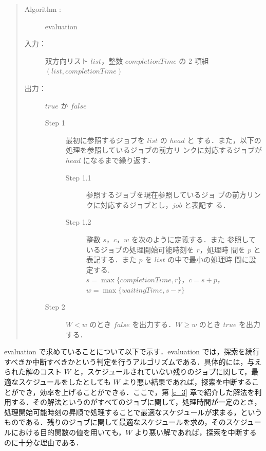\documentclass[12pt]{optlab-bachelor}
\begin{document}

\begin{quote}
  \begin{description}
    \item[{\sc Algorithm : }] {\sc evaluation}
    \item[入力：] 双方向リスト $list$，整数 $completionTime$ の
    2 項組\\ $(list,completionTime)$
    \item[出力：] $true$ か $false$
    \begin{description}
      \item[Step 1 ] 最初に参照するジョブを $list$ の $head$ と
      する．また，以下の処理を参照しているジョブの前方リ
      ンクに対応するジョブが $head$ になるまで繰り返す．
      \begin{description}
        \item[Step 1.1] 参照するジョブを現在参照しているジョ
        ブの前方リンクに対応するジョブとし，$job$ と表記す
        る．
        \item[Step 1.2 ] 整数 $s$，$c$，$w$ を次のように定義する．また
        参照しているジョブの処理開始可能時刻を $r$，処理時
        間を $p$ と表記する．また $p$ を $list$ の中で最小の処理時
        間に設定する.\\
        $s = \max\{completionTime, r\}$，$c = s + p$，\\$w =
        \max\{waitingTime,s - r\}$
      \end{description}
      \item[Step 2 ] $W < w$ のとき $false$ を出力する．$W \ge w$
      のとき $true$ を出力する．
    \end{description}
  \end{description}
\end{quote}

{\sc evaluation} で求めていることについて以下で示す．{\sc evaluation} では，探索を続行すべきか中断すべきかという判定を行うアルゴリズムである．具体的には，与えられた解のコスト $W$ と，スケジュールされていない残りのジョブに関して，最適なスケジュールをしたとしても $W$ より悪い結果であれば，探索を中断することができ，効率を上げることができる．ここで，第 \ref{c_3} 章で紹介した解法を利用する．その解法というのがすべてのジョブに関して，処理時間が一定のとき，処理開始可能時刻の昇順で処理することで最適なスケジュールが求まる，というものである．残りのジョブに関して最適なスケジュールを求め，そのスケジュールにおける目的関数の値を用いても，$W$ より悪い解であれば，探索を中断するのに十分な理由である．
\end{document}
